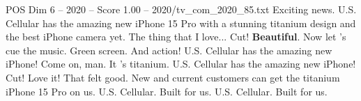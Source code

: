 \begin{textsample}{POS Dim 6 – 2020 – Score 1.00 – 2020/tv\_com\_2020\_85.txt}  \label{ex:f6_pos_050}
Exciting news.
U.S.
Cellular has the amazing new iPhone 15 Pro with a stunning titanium design and the best iPhone camera yet.
The thing that I love...
Cut! \textbf{Beautiful}.
Now let 's cue the music.
Green screen.
And action!
U.S.
Cellular has the amazing new iPhone!
Come on, man.
It 's titanium.
U.S.
Cellular has the amazing new iPhone!
Cut!
Love it!
That felt good.
New and current customers can get the titanium iPhone 15 Pro on us.
U.S.
Cellular.
Built for us.
U.S.
Cellular.
Built for us.

\end{textsample}
